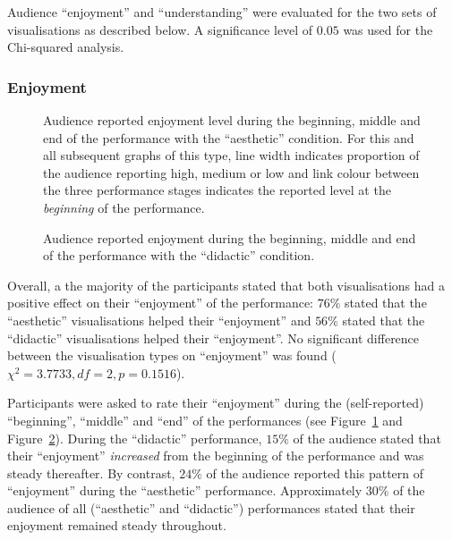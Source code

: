 \documentclass{sig-alternate}
\begin{document}
Audience ``enjoyment'' and ``understanding'' were evaluated for the
two sets of visualisations as described below. A significance level of
$0.05$ was used for the Chi-squared analysis.

\subsubsection{Enjoyment}

\begin{figure}
  \centering {}
  \caption{Audience reported enjoyment level during the beginning,
    middle and end of the performance with the ``aesthetic''
    condition. For this and all subsequent graphs of this type, line
    width indicates proportion of the audience reporting high, medium
    or low and link colour between the three performance stages
    indicates the reported level at the \emph{beginning} of the
    performance.}
\label{fig:aesthetic-enjoyment}
\end{figure}

\begin{figure}
\centering
{}
\caption{Audience reported enjoyment during the beginning, middle and
  end of the performance with the ``didactic'' condition.}
\label{fig:didactic-enjoyment}
\end{figure}

Overall, a the majority of the participants stated that both
visualisations had a positive effect on their ``enjoyment'' of the
performance: $76\%$ stated that the ``aesthetic'' visualisations
helped their ``enjoyment'' and $56\%$ stated that the ``didactic''
visualisations helped their ``enjoyment''. No significant difference
between the visualisation types on ``enjoyment'' was found
($\chi^2=3.7733,df=2,p=0.1516$).

Participants were asked to rate their ``enjoyment'' during the
(self-reported) ``beginning'', ``middle'' and ``end'' of the
performances (see Figure~\ref{fig:aesthetic-enjoyment} and
Figure~\ref{fig:didactic-enjoyment}). During the ``didactic''
performance, $15\%$ of the audience stated that their ``enjoyment''
\emph{increased} from the beginning of the performance and was
steady thereafter. By contrast, $24\%$ of the audience
reported this pattern of ``enjoyment'' during the ``aesthetic''
performance. Approximately $30\%$ of the audience of all
(``aesthetic'' and ``didactic'') performances stated that their
enjoyment remained steady throughout.
\end{document}
